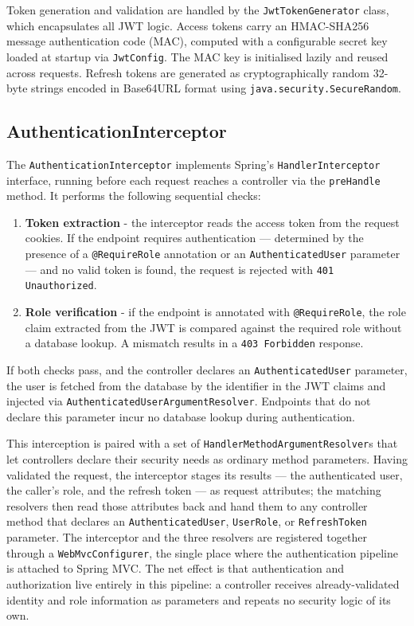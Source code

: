 Token generation and validation are handled by the \texttt{JwtTokenGenerator} class,
which encapsulates all JWT logic. Access tokens carry an HMAC-SHA256 message
authentication code (MAC), computed with a configurable secret key loaded at startup
via \texttt{JwtConfig}. The MAC key is initialised lazily and reused across requests. Refresh tokens are generated as
cryptographically random 32-byte strings encoded in Base64URL format using
\texttt{java.security.SecureRandom}.

\subsection{AuthenticationInterceptor} \label{sec:be_auth_interceptor}

The \texttt{AuthenticationInterceptor} implements Spring's \texttt{HandlerInterceptor}
interface, running before each request reaches a controller via the \texttt{preHandle}
method. It performs the following sequential checks:

\begin{enumerate}
    \item \textbf{Token extraction} - the interceptor reads the access token from the
          request cookies. If the endpoint requires authentication --- determined by the
          presence of a \texttt{@RequireRole} annotation or an \texttt{AuthenticatedUser}
          parameter --- and no valid token is found, the request is rejected with
          \texttt{401 Unauthorized}.

    \item \textbf{Role verification} - if the endpoint is annotated with
          \texttt{@RequireRole}, the role claim extracted from the JWT is compared against
          the required role without a database lookup. A mismatch results in a
          \texttt{403 Forbidden} response.
\end{enumerate}

If both checks pass, and the controller declares an \texttt{AuthenticatedUser}
parameter, the user is fetched from the database by the identifier in the JWT claims
and injected via \texttt{AuthenticatedUserArgumentResolver}. Endpoints that do not
declare this parameter incur no database lookup during authentication.

This interception is paired with a set of \texttt{HandlerMethodArgumentResolver}s that let
controllers declare their security needs as ordinary method parameters. Having validated
the request, the interceptor stages its results --- the authenticated user, the caller's
role, and the refresh token --- as request attributes; the matching resolvers then read those
attributes back and hand them to
any controller method that declares an \texttt{AuthenticatedUser}, \texttt{UserRole}, or
\texttt{RefreshToken} parameter. The interceptor and the three resolvers are registered
together through a \texttt{WebMvcConfigurer}, the single place where the authentication
pipeline is attached to Spring MVC. The net effect is that authentication and
authorization live entirely in this pipeline: a controller receives already-validated
identity and role information as parameters and repeats no security logic of its own.

